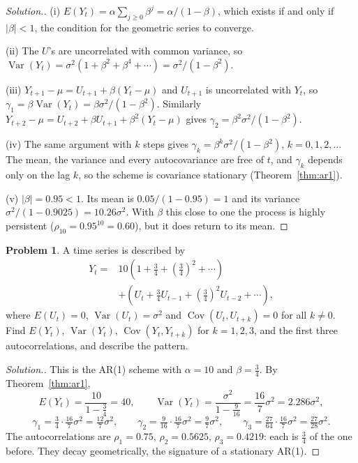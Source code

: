 \documentclass[11pt,a4paper]{article}
\numberwithin{equation}{section}
\DeclareMathOperator{\Var}{Var}
\DeclareMathOperator{\Cov}{Cov}
\theoremstyle{definition}
\newtheorem{problemx}{Problem}[subsection]
\newenvironment{problem}{\begin{problemx}}{\end{problemx}}
\newenvironment{solution}
  {\renewcommand{\qedsymbol}{}\begin{proof}[\textit{Solution}.]}
  {\end{proof}}
\begin{document}
\begin{solution}
(i) $E(Y_t) = \alpha\sum_{j\geq0}\beta^j = \alpha/(1 - \beta)$, which exists if and only if $|\beta| < 1$, the condition for the geometric series to converge.

(ii) The $U$'s are uncorrelated with common variance, so $\Var(Y_t) = \sigma^2(1 + \beta^2 + \beta^4 + \cdots) = \sigma^2/(1 - \beta^2)$.

(iii) $Y_{t+1} - \mu = U_{t+1} + \beta(Y_t - \mu)$ and $U_{t+1}$ is uncorrelated with $Y_t$, so $\gamma_1 = \beta\Var(Y_t) = \beta\sigma^2/(1 - \beta^2)$. Similarly
$Y_{t+2} - \mu = U_{t+2} + \beta U_{t+1} + \beta^2(Y_t - \mu)$ gives $\gamma_2 = \beta^2\sigma^2/(1 - \beta^2)$.

(iv) The same argument with $k$ steps gives $\gamma_k = \beta^k\sigma^2/(1 - \beta^2)$, $k = 0, 1, 2, \dots$ The mean, the variance and every
autocovariance are free of $t$, and $\gamma_k$ depends only on the lag $k$, so the scheme is covariance stationary (Theorem~\ref{thm:ar1}).

(v) $|\beta| = 0.95 < 1$. Its mean is $0.05/(1 - 0.95) = 1$ and its variance $\sigma^2/(1 - 0.9025) = 10.26\sigma^2$. With $\beta$ this close to one the process is
highly persistent ($\rho_{10} = 0.95^{10} = 0.60$), but it does return to its mean.
\end{solution}

\begin{problem}
A time series is described by
\begin{align*}
Y_t = {}& 10\left(1 + \frac34 + \left(\frac34\right)^2 + \cdots\right)\\
&+ \left(U_t + \frac34U_{t-1} + \left(\frac34\right)^2U_{t-2} + \cdots\right),
\end{align*}
where $E(U_t) = 0$, $\Var(U_t) = \sigma^2$ and $\Cov(U_t, U_{t+k}) = 0$ for all $k \neq 0$. Find $E(Y_t)$, $\Var(Y_t)$, $\Cov(Y_t, Y_{t+k})$ for
$k = 1, 2, 3$, and the first three autocorrelations, and describe the pattern.
\end{problem}

\begin{solution}
This is the AR(1) scheme with $\alpha = 10$ and $\beta = \frac34$. By Theorem~\ref{thm:ar1},
\[
E(Y_t) = \frac{10}{1 - \frac34} = 40, \qquad \Var(Y_t) = \frac{\sigma^2}{1 - \frac{9}{16}} = \frac{16}{7}\sigma^2 = 2.286\sigma^2 ,
\]
\[
\gamma_1 = \tfrac34\cdot\tfrac{16}{7}\sigma^2 = \tfrac{12}{7}\sigma^2, \qquad
\gamma_2 = \tfrac{9}{16}\cdot\tfrac{16}{7}\sigma^2 = \tfrac{9}{7}\sigma^2, \qquad
\gamma_3 = \tfrac{27}{64}\cdot\tfrac{16}{7}\sigma^2 = \tfrac{27}{28}\sigma^2 .
\]
The autocorrelations are $\rho_1 = 0.75$, $\rho_2 = 0.5625$, $\rho_3 = 0.4219$: each is $\frac34$ of the one before. They decay geometrically, the
signature of a stationary AR(1).
\end{solution}
\end{document}

